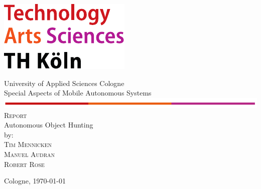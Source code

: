 \documentclass[a4paper,12pt,oneside]{article}
\begin{document}
\pagestyle{empty}
\begin{titlepage}
	\includegraphics[scale=1.00]{sources/logo_TH-Koeln_CMYK_22pt-eps-converted-to.pdf}\\
	\begin{center}
		\large
		University of Applied Sciences Cologne\\
		Special Aspects of Mobile Autonomous Systems\\
		\includegraphics[scale=1.0]{sources/TH.PNG}\\
		\vspace{1cm}
		\textsc{Report}\\
		\vspace{2cm} %
		\LARGE
		Autonomous Object Hunting\\
		\vspace{3cm}
		\large
		\vspace{1.0cm}
		by:\\
		\textsc{Tim Mennicken}\\
		\textsc{Manuel Audran}\\
		\textsc{Robert Rose}
		\vspace{1cm}

		\vspace{5cm}
		Cologne, \today
	\end{center}    
\end{titlepage}

\newpage
\thispagestyle{TOC}
\tableofcontents

\newpage
\thispagestyle{TOC}
\listoffigures

\newpage
\thispagestyle{TOC}
\listoftables







\end{document}
